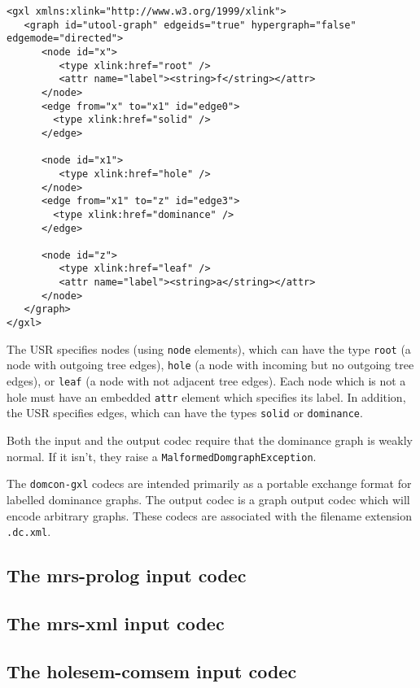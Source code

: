 \begin{verbatim}
<gxl xmlns:xlink="http://www.w3.org/1999/xlink">
   <graph id="utool-graph" edgeids="true" hypergraph="false" edgemode="directed">
      <node id="x">
         <type xlink:href="root" />
         <attr name="label"><string>f</string></attr>
      </node>
      <edge from="x" to="x1" id="edge0">
        <type xlink:href="solid" />
      </edge>

      <node id="x1">
         <type xlink:href="hole" />
      </node>
      <edge from="x1" to="z" id="edge3">
        <type xlink:href="dominance" />
      </edge>

      <node id="z">
         <type xlink:href="leaf" />
         <attr name="label"><string>a</string></attr>
      </node>
   </graph>
</gxl>
\end{verbatim}

The USR specifies nodes (using \verb?node? elements), which can have
the type \verb?root? (a node with outgoing tree edges), \verb?hole? (a
node with incoming but no outgoing tree edges), or \verb?leaf? (a node
with not adjacent tree edges). Each node which is not a hole must have
an embedded \verb?attr? element which specifies its label. In
addition, the USR specifies edges, which can have the types
\verb?solid? or \verb?dominance?.

Both the input and the output codec require that the dominance graph
is weakly normal. If it isn't, they raise a
\verb?MalformedDomgraphException?.

The \verb?domcon-gxl? codecs are intended primarily as a portable
exchange format for labelled dominance graphs. The output codec is a
graph output codec which will encode arbitrary graphs. These codecs
are associated with the filename extension \verb?.dc.xml?.



\subsection{The mrs-prolog input codec}

\cite{mrs-dom}


\subsection{The mrs-xml input codec}




\subsection{The holesem-comsem input codec}


